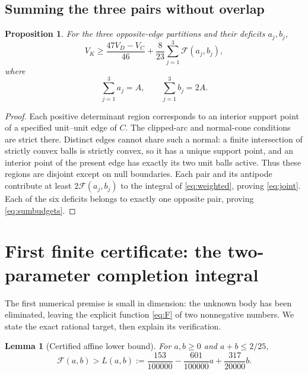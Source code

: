 \documentclass[11pt]{article}
\numberwithin{equation}{section}
\newtheorem{lemma}[theorem]{Lemma}
\newtheorem{proposition}[theorem]{Proposition}
\theoremstyle{definition}\newtheorem{definition}[theorem]{Definition}
\theoremstyle{remark}\newtheorem{remark}[theorem]{Remark}
\begin{document}
\subsection{Summing the three pairs without overlap}
\begin{proposition}\label{prop:joint}
For the three opposite-edge partitions and their deficits $a_j,b_j$,
\begin{equation}\label{eq:joint}
 \boxed{V_K\ge\frac{47V_D-V_C}{46}
                  +\frac8{23}\sum_{j=1}^3\mathcal F(a_j,b_j),}
\end{equation}
where
\begin{equation}\label{eq:sumbudgets}
 \sum_{j=1}^3a_j=A,\qquad\sum_{j=1}^3b_j=2A.
\end{equation}
\end{proposition}
\begin{proof}
Each positive determinant region corresponds to an interior support point
of a specified unit--unit edge of $C$. The clipped-arc and normal-cone
conditions are strict there. Distinct edges cannot share such a normal:
a finite intersection of strictly convex balls is strictly convex, so it
has a unique support point, and an interior point of the present edge has
exactly its two unit balls active. Thus these regions are disjoint except
on null boundaries. Each pair and its antipode contribute at least
$2\mathcal F(a_j,b_j)$ to the integral of \cref{eq:weighted}, proving
\cref{eq:joint}. Each of the six deficits belongs to exactly one opposite
pair, proving \cref{eq:sumbudgets}.
\end{proof}

\section{First finite certificate: the two-parameter completion integral}\label{sec:integralcert}
The first numerical premise is small in dimension: the unknown body has been
eliminated, leaving the explicit function \cref{eq:F} of two nonnegative
numbers. We state the exact rational target, then explain its verification.

\begin{lemma}[Certified affine lower bound]\label{lem:affine}
For $a,b\ge0$ and $a+b\le2/25$,
\begin{equation}\label{eq:affine}
 \boxed{\mathcal F(a,b)>L(a,b):=
 \frac{153}{100000}-\frac{601}{100000}a+\frac{317}{20000}b.}
\end{equation}
\end{lemma}
\end{document}
